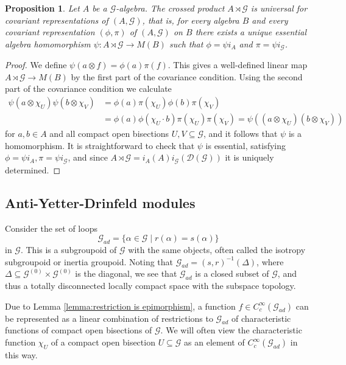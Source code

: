 \documentclass{amsart}
\newtheorem{prop}[thm]{Proposition}
\newcommand{\G}{\mathcal{G}}
\newcommand{\DG}{\mathcal{D}(\mathcal{G})}
\newcommand{\ccinfty}{C_c^\infty}
\begin{document}
\begin{prop} \label{crossedproductuniversal}
Let $ A $ be a $ \G $-algebra. The crossed product $ A \rtimes \G $ is universal for covariant representations of $ (A, \G) $, that is, for every algebra $ B $ and every covariant representation $ (\phi, \pi) $ of $ (A,\G) $ on $ B $ there exists a unique essential algebra homomorphism $ \psi: A \rtimes \G \rightarrow M(B) $ such that $ \phi = \psi i_A $ 
and $ \pi = \psi i_\G $. 
\end{prop}

\begin{proof} 
We define $ \psi(a \otimes f) = \phi(a) \pi(f) $. This gives a well-defined linear map $ A \rtimes \G \rightarrow M(B) $ by the first part of the covariance condition. Using the second part of the covariance condition we calculate 
\begin{align*}
\psi(a \otimes \chi_U) \psi(b \otimes \chi_V) &= \phi(a) \pi(\chi_U) \phi(b) \pi(\chi_V) \\
&= \phi(a) \phi(\chi_U \cdot b) \pi(\chi_U) \pi(\chi_V) = \psi((a \otimes \chi_U)(b \otimes \chi_V))
\end{align*}
for $ a,b \in A $ and all compact open bisections $ U,V \subseteq \G $, and it follows that $ \psi $ is a homomorphism. It is straightforward to check that $ \psi $ is essential, satisfying $ \phi = \psi i_A, \pi = \psi i_\G $, and since $ A \rtimes \G = i_A(A) i_\G(\DG) $ it is uniquely determined. 
\end{proof}


\subsection{Anti-Yetter-Drinfeld modules}

Consider the set of loops 
$$
\G_{ad} = \{\alpha\in \G \mid r(\alpha)=s(\alpha)\} 
$$ 
in $ \G $. This is a subgroupoid of  $\G $ with the same objects, often called the isotropy subgroupoid or inertia groupoid. 
Noting that $ \G_{ad} = (s,r)^{-1}(\Delta) $, where 
$ \Delta \subseteq \G^{(0)} \times \G^{(0)} $ is the diagonal, we see that $ \G_{ad} $ is a closed subset of $ \G $, and thus a totally disconnected locally compact space with the subspace topology.

Due to Lemma \ref{lemma:restriction is epimorphism}, a function $ f \in \ccinfty(\G_{ad}) $ can be represented as a linear combination of restrictions to $ \G_{ad} $ of characteristic functions of compact open bisections of $ \G $. 
We will often view the characteristic function $ \chi_U $ of a compact open bisection $ U \subseteq \G $ as an element of $ \ccinfty(\G_{ad}) $ in this way. 
\end{document}
